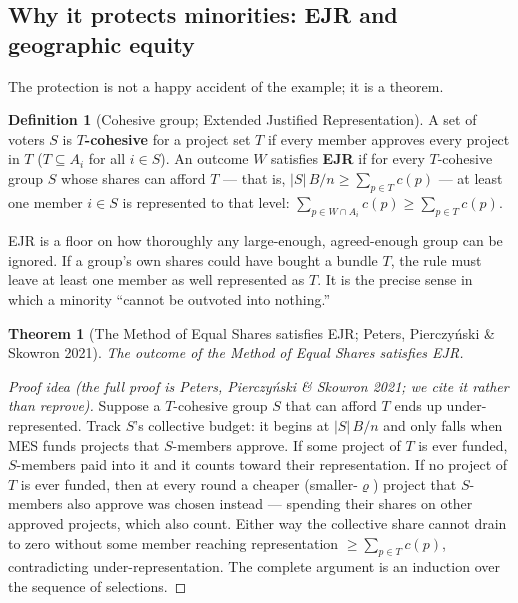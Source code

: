 \documentclass[11pt,letterpaper]{article}
\theoremstyle{definition}
\newtheorem{definition}{Definition}[section]
\theoremstyle{plain}
\newtheorem{theorem}{Theorem}[section]
\theoremstyle{remark}
\newcommand{\budget}{B}
\newcommand{\cost}{c}
\newcommand{\mesrho}{\varrho}      %
\providecommand{\citealp}[1]{Peters, Pierczy\'nski \& Skowron 2021}
\begin{document}
\subsection{Why it protects minorities: EJR and geographic equity}

The protection is not a happy accident of the example; it is a theorem.

\begin{definition}[Cohesive group; Extended Justified Representation]
\label{def:ejr}
A set of voters $S$ is \textbf{$T$-cohesive} for a project set $T$ if every member approves every
project in $T$ ($T\subseteq A_i$ for all $i\in S$). An outcome $W$ satisfies \textbf{EJR} if for
every $T$-cohesive group $S$ whose shares can afford $T$ --- that is,
$|S|\,\budget/n\ge\sum_{p\in T}\cost(p)$ --- at least one member $i\in S$ is represented to that
level: $\sum_{p\in W\cap A_i}\cost(p)\ge\sum_{p\in T}\cost(p)$.
\end{definition}

\begin{intuition}
EJR is a floor on how thoroughly any large-enough, agreed-enough group can be ignored. If a
group's own shares could have bought a bundle $T$, the rule must leave at least one member as well
represented as $T$. It is the precise sense in which a minority ``cannot be outvoted into nothing.''
\end{intuition}

\begin{theorem}[The Method of Equal Shares satisfies EJR; \citealp{peters2021}]
\label{thm:ejr}
The outcome of the Method of Equal Shares satisfies EJR.
\end{theorem}

\begin{proof}[Proof idea (the full proof is \citealp{peters2021}; we cite it rather than reprove)]
Suppose a $T$-cohesive group $S$ that can afford $T$ ends up under-represented. Track $S$'s
collective budget: it begins at $|S|\,\budget/n$ and only falls when MES funds projects that
$S$-members approve. If some project of $T$ is ever funded, $S$-members paid into it and it counts
toward their representation. If no project of $T$ is ever funded, then at every round a cheaper
(smaller-$\mesrho$) project that $S$-members also approve was chosen instead --- spending their
shares on other approved projects, which also count. Either way the collective share cannot drain
to zero without some member reaching representation $\ge\sum_{p\in T}\cost(p)$, contradicting
under-representation. The complete argument is an induction over the sequence of selections.
\end{proof}
\end{document}
